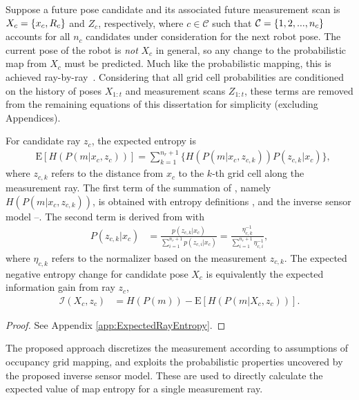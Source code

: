 Suppose a future pose candidate and its associated future measurement scan is $X_c=\left\{ x_c,R_c \right\}$ and $Z_c$, respectively, where $c\in\mathcal C$ such that $\mathcal C=\left\{ 1,2,...,n_c \right\}$ accounts for all $n_c$ candidates under consideration for the next robot pose. The current pose of the robot is \emph{not} $X_c$ in general, so any change to the probabilistic map from $X_c$ must be predicted. Much like the probabilistic mapping, this is achieved ray-by-ray~\cite{KauAiLee16,KauTakAiLee17}. Considering that all grid cell probabilities are conditioned on the history of poses $X_{1:t}$ and measurement scans $Z_{1:t}$, these terms are removed from the remaining equations of this dissertation for simplicity (excluding Appendices). 

\begin{prop}
\label{prop:ExpectedH}
For candidate ray $z_c$, the expected entropy is
\begin{align}
\label{eqn:DiscExpEntropyRay}
&\text{E}[H(P(m|x_c,z_{c}))]=\sum_{k=1}^{n_{r}+1}\bigg\{H(P(m|x_c,z_{c,k}))P(z_{c,k}|x_c)\bigg\},
\end{align}
where $z_{c,k}$ refers to the distance from $x_c$ to the $k$-th grid cell along the measurement ray. The first term of the summation of , namely $H(P(m|x_c,z_{c,k}))$, is obtained with entropy definitions ,  and the inverse sensor model --. The second term is derived from  with
\begin{align}
\label{eqn:ProbMeas}
P(z_{c,k}|x_c)&=\frac{p(z_{c,k}|x_c)}{\sum_{i=1}^{n_{r}+1}p(z_{c,i}|x_c)}=\frac{\eta_{c,k}^{-1}}{\sum_{i=1}^{n_{r}+1}\eta_{c,i}^{-1}},
\end{align}
where $\eta_{c,k}$ refers to the normalizer based on the measurement $z_{c,k}$.
The expected negative entropy change for candidate pose $X_c$ is equivalently the expected information gain from ray $z_c$,
\begin{align}
\label{eqn:expectedInfoGainRay}
\mathcal I(X_c,z_c)&=H(P(m))-\text{E}\left[H(P(m|X_c,z_c))\right].
\end{align}
\end{prop}
\begin{proof}
See Appendix \ref{app:ExpectedRayEntropy}.
\end{proof}

The proposed approach discretizes the measurement according to assumptions of occupancy grid mapping, and exploits the probabilistic properties uncovered by the proposed inverse sensor model. These are used to directly calculate the expected value of map entropy for a single measurement ray. 





